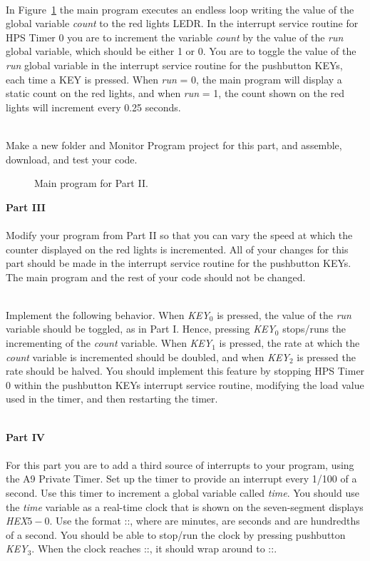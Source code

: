 \documentclass[epsfig,10pt,fullpage]{article}
\begin{document}
~\\
\noindent
In Figure~\ref{fig:code2} the main program executes an endless loop writing the value of
the global variable {\it count} to the red lights LEDR.  In the interrupt service routine for 
HPS Timer 0 you are to increment the variable {\it count} 
by the value of the {\it run} global variable, 
which should be either 1 or 0.  You are to toggle the value of the {\it run} global variable 
in the interrupt service routine for the pushbutton KEYs, each time a KEY is pressed.
When {\it run} = 0, the main program will display a static count on the red lights,
and when {\it run} = 1, the count shown on the red lights will increment every 0.25 seconds.

~\\
\noindent
Make a new folder and Monitor Program project for this part, and assemble, download, and 
test your code.

\begin{figure}[H]
\begin{center}

\end{center}
\caption{Main program for Part II.}
\label{fig:code2}
\end{figure}

\newpage
\noindent
{\bf Part III}
~\\
~\\
\noindent
Modify your program from Part II so that you can vary the speed at which the counter
displayed on the red lights is incremented. All of your changes for this part should be made
in the interrupt service routine for the pushbutton KEYs. The main program and the rest of
your code should not be changed.

~\\
\noindent
Implement the following behavior. When {\it KEY}$_0$ is pressed, the value of the {\it run}
variable should be toggled, as in Part I. Hence, pressing {\it KEY}$_0$ stops/runs
the incrementing of the {\it count} variable. When {\it KEY}$_1$ is pressed, the rate at which
the {\it count} variable is incremented should be doubled, and when {\it KEY}$_2$ is pressed the
rate should be halved. You should implement this feature by stopping HPS Timer 0 within
the pushbutton KEYs interrupt service routine, modifying the load value used in the
timer, and then restarting the timer.

~\\
\noindent
{\bf Part IV}
~\\
~\\
\noindent
For this part you are to add a third source of interrupts to your program, using the A9
Private Timer. Set up the timer to provide an interrupt every 1/100 of a second. Use this
timer to increment a global variable called {\it time}. You should use the {\it time} variable as
a real-time clock that is shown on the seven-segment displays {\it HEX}$5-0$. Use the format 
::, where  are minutes,  are seconds 
and  are hundredths of a second.
You should be able to stop/run the clock by pressing pushbutton {\it KEY}$_3$.
When the clock reaches ::, it should wrap around to 
::.
\end{document}
